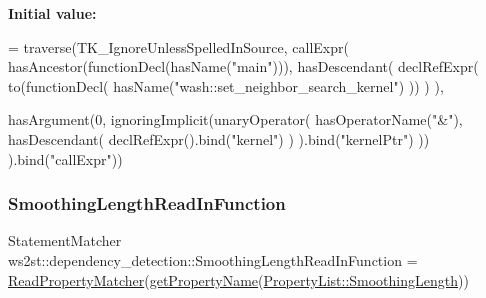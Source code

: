 {\bfseries Initial value\+:}
\begin{DoxyCode}
= traverse(TK\_IgnoreUnlessSpelledInSource, callExpr(
        hasAncestor(functionDecl(hasName(\textcolor{stringliteral}{"main"}))),
        hasDescendant(
            declRefExpr(
                to(functionDecl(
                    hasName(\textcolor{stringliteral}{"wash::set\_neighbor\_search\_kernel"})
                ))
            )
        ),
        
        hasArgument(0, ignoringImplicit(unaryOperator(
            hasOperatorName(\textcolor{stringliteral}{"&"}),
            hasDescendant(
                declRefExpr().bind(\textcolor{stringliteral}{"kernel"})
            )
        ).bind(\textcolor{stringliteral}{"kernelPtr"}) ))
    ).bind(\textcolor{stringliteral}{"callExpr"}))
\end{DoxyCode}
\mbox{\label{namespacews2st_1_1dependency__detection_aeaa222ced9f9c42eb5d582b4da3656a4}} 
\subsubsection{\texorpdfstring{Smoothing\+Length\+Read\+In\+Function}{SmoothingLengthReadInFunction}}
{\footnotesize\ttfamily Statement\+Matcher ws2st\+::dependency\+\_\+detection\+::\+Smoothing\+Length\+Read\+In\+Function = \mbox{\hyperlink{namespacews2st_1_1dependency__detection_aa8821ec3e79b7058ff4ac29b7b5a8374}{Read\+Property\+Matcher}}(\mbox{\hyperlink{namespacews2st_1_1dependency__detection_aa7715a6e777bd59ab78718644a58b1fa}{get\+Property\+Name}}(\mbox{\hyperlink{namespacews2st_1_1dependency__detection_abcddd986f080a9e5c494edfad3c3faf7a209c4a2539e3220aadbf61e605f9bfdc}{Property\+List\+::\+Smoothing\+Length}}))}

\mbox{\label{namespacews2st_1_1dependency__detection_a9fd262ba400c93f1801d2d57b50e0d9d}} 
